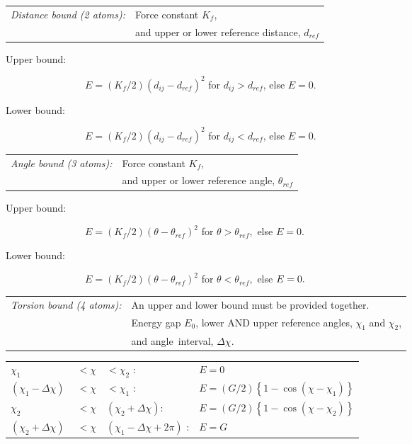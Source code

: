 \begin{tabular}{ll}
{\em Distance bound (2 atoms):} & Force constant $K_{f}$, \\ 
& and upper or lower reference distance, $d_{ref}$
\end{tabular}

\qquad Upper bound:

$\qquad \qquad \qquad \qquad E=\left( K_{f}/2\right) \left(
d_{ij}-d_{ref}\right) ^{2}$ for $d_{ij}>d_{ref}$, else $E=0$.

\qquad Lower bound:

$\qquad \qquad \qquad \qquad E=\left( K_{f}/2\right) \left(
d_{ij}-d_{ref}\right) ^{2}$ for $d_{ij}<d_{ref}$, else $E=0$.\medskip
\medskip 

\begin{tabular}{ll}
{\em Angle bound (3 atoms):} & Force constant $K_{f}$, \\ 
& and upper or lower reference angle, $\theta _{ref}$
\end{tabular}

\qquad Upper bound:

$\qquad \qquad \qquad \qquad E=\left( K_{f}/2\right) \left( \theta -\theta
_{ref}\right) ^{2}$ for $\theta >\theta _{ref},$ else $E=0$.

\qquad Lower bound:

$\qquad \qquad \qquad \qquad E=\left( K_{f}/2\right) \left( \theta -\theta
_{ref}\right) ^{2}$ for $\theta <\theta _{ref},$ else $E=0.\medskip \medskip
\medskip $

\begin{tabular}{ll}
{\em Torsion bound (4 atoms):} & An upper and lower bound must be provided
together. \\ 
& Energy gap $E_{0}$, lower AND upper reference angles, $\chi _{1}$ and $
\chi _{2}$, \\ 
& and angle~interval, $\Delta \chi .$
\end{tabular}

\qquad \qquad 
\begin{tabular}{llll}
$\chi _{1}$ & $<\chi $ & $<\chi _{2}$ : & $E=0$ \\ 
$\left( \chi _{1}-\Delta \chi \right) $ & $<\chi $ & $<\chi _{1}$ : & $
E=\left( G/2\right) \left\{ 1-\cos \left( \chi -\chi _{1}\right) \right\} $
\\ 
$\chi _{2}$ & $<\chi $ & $\left( \chi _{2}+\Delta \chi \right) $: & $
E=\left( G/2\right) \left\{ 1-\cos \left( \chi -\chi _{2}\right) \right\} $
\\ 
$\left( \chi _{2}+\Delta \chi \right) ~$ & $<\chi $ & $\left( \chi
_{1}-\Delta \chi +2\pi \right) $ : & $E=G$
\end{tabular}

